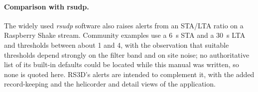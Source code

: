 \paragraph{Comparison with rsudp.} The widely used \emph{rsudp} software \parencite{rsudp} also raises alerts from an
STA/LTA ratio on a Raspberry Shake stream. Community examples use a 6~s STA and a 30~s LTA and thresholds between about 1 and
4, with the observation that suitable thresholds depend strongly on the filter band and on site noise; no authoritative list of
its built-in defaults could be located while this manual was written, so none is quoted here. RS3D's alerts are intended to
complement it, with the added record-keeping and the helicorder and detail views of the application.
